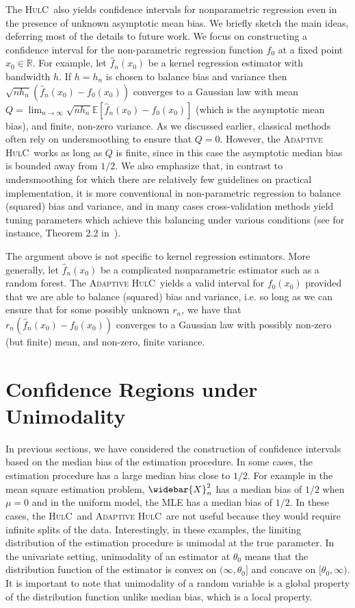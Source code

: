 \documentclass{article}
\newcommand{\E}{\mbox{$\mathbb{E}$}}
\newcommand{\clr}{\color{black}}
\newcommand{\hulc}{\textsc{HulC}~}
\newcommand{\ahulc}{\textsc{Adaptive HulC}~}
\numberwithin{myalgctr}{section}
\begin{document}
The \hulc also yields
confidence intervals
for nonparametric regression
even in the presence of unknown
asymptotic {\color{black}mean} bias. We briefly sketch the main ideas, deferring most of the details to future work. We focus on constructing a confidence interval for
the non-parametric regression function $f_0$ at a fixed point $x_0\in\mathbb{R}$.
For example, let
$\widehat{f}_n(x_0)$
be a kernel regression estimator
with bandwidth $h$.
If $h=h_n$ is chosen to balance bias and variance
then
$\sqrt{n h_n}(\widehat{f}_n(x_0)-f_0(x_0))$
converges to a Gaussian law
with mean
$Q = \lim_{n\to\infty} \sqrt{n h_n} \E[\widehat{f}_n(x_0) - f_0(x_0)]$
(which is the asymptotic {\color{black}mean} bias), and finite, non-zero variance. 
As we discussed earlier, classical methods often rely on undersmoothing to ensure that $Q = 0$. However, the \ahulc works as long as $Q$ is finite, since in this case 
the asymptotic median bias is bounded away from $1/2$. We also emphasize that, in contrast to undersmoothing for which there 
are relatively few guidelines on practical implementation, it is more conventional in non-parametric regression to balance (squared) bias and variance, and in many cases
cross-validation methods yield tuning parameters which achieve this balancing under various conditions (see for instance, Theorem 2.2 in~\cite{li2004cross}). 


The argument above is not specific to kernel regression estimators. More generally,
let $\widehat{f}_n(x_0)$
be a complicated nonparametric estimator
such as a random forest. The \ahulc yields a valid interval for $f_0(x_0)$ provided that we are able to balance (squared) bias and variance, i.e. so long as we can ensure that for
some possibly unknown 
$r_n$,
we have that
$r_n (\widehat{f}_n(x_0) - f_0(x_0))$
converges to a Gaussian law with possibly
non-zero (but finite) mean, and non-zero, finite variance.

\section{Confidence Regions under Unimodality}\label{sec:unimodality-lanke}
In previous sections, we have considered the construction of confidence intervals based on the median bias of the estimation procedure. In some cases, the estimation procedure has a large
median bias close to $1/2$. For example in the mean square estimation problem, $\widebar{X}_n^2$ has a median bias of $1/2$ when $\mu = 0$ and in the uniform model, the MLE has a median bias of $1/2$. In these cases, 
the \hulc and \ahulc are not useful because they would require infinite splits of the data. Interestingly, in these examples, the limiting distribution of the estimation procedure is unimodal at the true parameter. In the univariate setting, unimodality {\color{black}of an estimator} at $\theta_0$ means that the distribution function {\color{black}of the estimator} is convex on $(\infty, \theta_0]$ and concave on $[\theta_0, \infty)$. {\clr It is important to note that unimodality of a random variable is a global property of the distribution function unlike median bias, which is a local property.}
\end{document}
